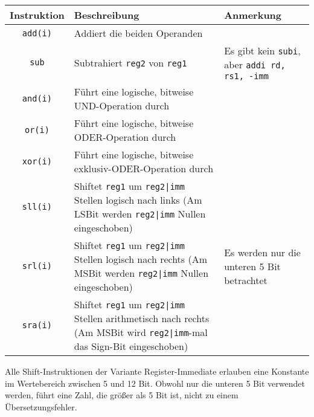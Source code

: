 \vspace{-0.2cm}
\begin{table}[H]
  \begin{tabular}{ c p{8cm} p{4cm}}
    \textbf{Instruktion} & \textbf{Beschreibung} & \textbf{Anmerkung}\\
    \toprule
  	\texttt{add(i)} & Addiert die beiden Operanden & \\

    \midrule

  	\texttt{sub} & Subtrahiert \texttt{reg2} von \texttt{reg1} & Es gibt kein
  	\texttt{subi}, aber \texttt{addi rd, rs1, -imm} \\ \midrule

  	\texttt{and(i)} & Führt eine logische, bitweise UND-Operation durch & \\
  	\midrule

  	\texttt{or(i)} & Führt eine logische, bitweise ODER-Operation durch & \\
  	\midrule

  	\texttt{xor(i)} & Führt eine logische, bitweise exklusiv-ODER-Operation
  	durch & \\ \midrule

  	\texttt{sll(i)} & Shiftet \texttt{reg1} um \texttt{reg2|imm} Stellen logisch
  	nach links (Am LSBit werden \texttt{reg2|imm} Nullen eingeschoben) &
  	\multirow{3}{4cm}{Es werden nur die unteren 5 Bit betrachtet} \\

    \midrule

  	\texttt{srl(i)} & Shiftet \texttt{reg1} um \texttt{reg2|imm} Stellen logisch
  	nach rechts (Am MSBit werden \texttt{reg2|imm} Nullen eingeschoben) & \\

    \midrule

  	\texttt{sra(i)} & Shiftet \texttt{reg1} um \texttt{reg2|imm} Stellen
  	arithmetisch nach rechts (Am MSBit wird \texttt{reg2|imm}-mal das Sign-Bit
  	eingeschoben) & \\

  \end{tabular}
\end{table}

\begin{warningblock}
Alle Shift-Instruktionen der Variante Register-Immediate erlauben eine
Konstante im Wertebereich zwischen 5 und 12 Bit. Obwohl nur die unteren 5 Bit
verwendet werden, führt eine Zahl, die größer als 5 Bit ist, nicht zu einem
Übersetzungsfehler.
\end{warningblock}


